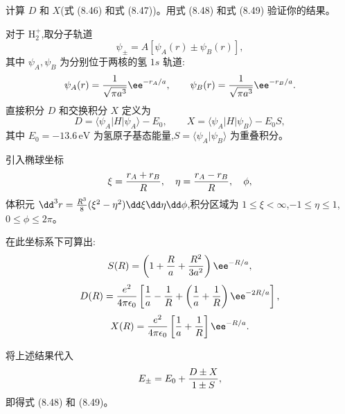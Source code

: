\begin{question}
计算 $D$ 和 $X$(式 (8.46) 和式 (8.47))。用式 (8.48) 和式 (8.49) 验证你的结果。

\par\smallskip
{}

\begin{solution}
对于 $\mathrm H_2^+$,取分子轨道
\[
\psi_\pm=A[\psi_A(r)\pm\psi_B(r)],
\]
其中 $\psi_A,\psi_B$ 为分别位于两核的氢 $1s$ 轨道:
\[
\psi_A(r)={1\over\sqrt{\pi a^3}}\ee^{-r_A/a},\qquad
\psi_B(r)={1\over\sqrt{\pi a^3}}\ee^{-r_B/a}.
\]
直接积分 $D$ 和交换积分 $X$ 定义为
\[
D=\langle\psi_A|H|\psi_A\rangle-E_0,\qquad
X=\langle\psi_A|H|\psi_B\rangle-E_0S,
\]
其中 $E_0=-13.6\,\mathrm{eV}$ 为氢原子基态能量,$S=\langle\psi_A|\psi_B\rangle$ 为重叠积分。

引入椭球坐标
\[
\xi={r_A+r_B\over R},\quad \eta={r_A-r_B\over R},\quad \phi,
\]
体积元 $\dd^3r={R^3\over8}(\xi^2-\eta^2)\dd\xi\dd\eta\dd\phi$,积分区域为 $1\le\xi<\infty$,$-1\le\eta\le1$,$0\le\phi\le2\pi$。

在此坐标系下可算出:
\[
S(R)=\left(1+{R\over a}+{R^2\over3a^2}\right)\ee^{-R/a},
\]
\[
D(R)={e^2\over4\pi\epsilon_0}\left[{1\over a}-{1\over R}+\left({1\over a}+{1\over R}\right)\ee^{-2R/a}\right],
\]
\[
X(R)={e^2\over4\pi\epsilon_0}\left[{1\over a}+{1\over R}\right]\ee^{-R/a}.
\]

将上述结果代入
\[
E_\pm=E_0+{D\pm X\over1\pm S},
\]
即得式 (8.48) 和 (8.49)。
\end{solution}
\end{question}


